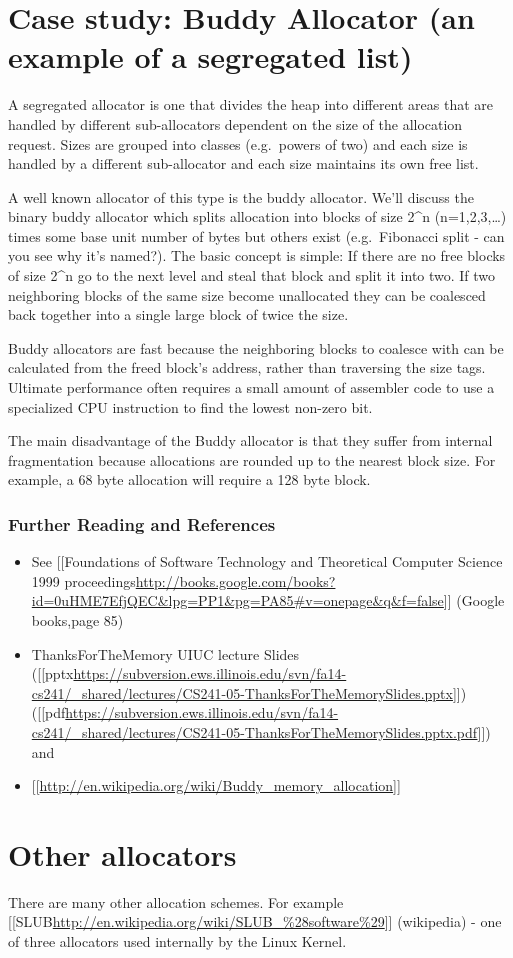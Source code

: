 \section{Case study: Buddy Allocator (an example of a segregated
list)}\label{case-study-buddy-allocator-an-example-of-a-segregated-list}

A segregated allocator is one that divides the heap into different areas
that are handled by different sub-allocators dependent on the size of
the allocation request. Sizes are grouped into classes (e.g.~powers of
two) and each size is handled by a different sub-allocator and each size
maintains its own free list.

A well known allocator of this type is the buddy allocator. We'll
discuss the binary buddy allocator which splits allocation into blocks
of size 2\^{}n (n=1,2,3,\ldots{}) times some base unit number of bytes
but others exist (e.g.~Fibonacci split - can you see why it's named?).
The basic concept is simple: If there are no free blocks of size 2\^{}n
go to the next level and steal that block and split it into two. If two
neighboring blocks of the same size become unallocated they can be
coalesced back together into a single large block of twice the size.

Buddy allocators are fast because the neighboring blocks to coalesce
with can be calculated from the freed block's address, rather than
traversing the size tags. Ultimate performance often requires a small
amount of assembler code to use a specialized CPU instruction to find
the lowest non-zero bit.

The main disadvantage of the Buddy allocator is that they suffer from
internal fragmentation because allocations are rounded up to the nearest
block size. For example, a 68 byte allocation will require a 128 byte
block.

\subsubsection{Further Reading and
References}\label{further-reading-and-references}

\begin{itemize}
\itemsep1pt\parskip0pt
\item
  See {[}{[}Foundations of Software Technology and Theoretical Computer
  Science 1999
  proceedings\textbar{}\url{http://books.google.com/books?id=0uHME7EfjQEC\&lpg=PP1\&pg=PA85\#v=onepage\&q\&f=false}{]}{]}
  (Google books,page 85)
\item
  ThanksForTheMemory UIUC lecture Slides
  ({[}{[}pptx\textbar{}\url{https://subversion.ews.illinois.edu/svn/fa14-cs241/_shared/lectures/CS241-05-ThanksForTheMemorySlides.pptx}{]}{]})
  ({[}{[}pdf\textbar{}\url{https://subversion.ews.illinois.edu/svn/fa14-cs241/_shared/lectures/CS241-05-ThanksForTheMemorySlides.pptx.pdf}{]}{]})\\and
\item
  {[}{[}\url{http://en.wikipedia.org/wiki/Buddy_memory_allocation}{]}{]}
\end{itemize}

\section{Other allocators}\label{other-allocators}

There are many other allocation schemes. For example
{[}{[}SLUB\textbar{}\url{http://en.wikipedia.org/wiki/SLUB_\%28software\%29}{]}{]}
(wikipedia) - one of three allocators used internally by the Linux
Kernel.
